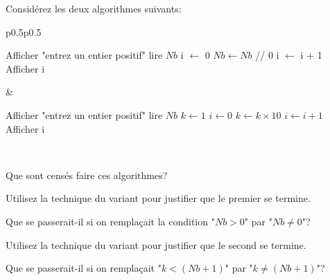 \documentclass[12pt]{article}
\begin{document}
	\begin{MonExo}
		Considérez les deux algorithmes suivants:
		\vspace{\baselineskip}
		
		\begin{tabular}{p{0.5\textwidth}p{0.5\textwidth}}
			\begin{minipage}{\linewidth}
				\begin{algorithmic}[1]
					\State Afficher "entrez un entier positif"
					\State lire $Nb$
					\State i $\leftarrow$ 0
					\State $Nb \leftarrow Nb$ // $0$
					\State i $\leftarrow$ i + 1
					\EndWhile
					\State Afficher i
				\end{algorithmic}
			\end{minipage}
		&
			\begin{minipage}{\linewidth}
				\begin{algorithmic}[1]
					\State Afficher "entrez un entier positif"
			 		\State lire $Nb$
			 		\State $k \leftarrow 1$
			 		\State $i \leftarrow 0$
			 		\State $k \leftarrow k \times 10$
			 		\State $i \leftarrow i + 1$
			 		\EndWhile
			 		\State Afficher i
			 	\end{algorithmic}
			 \end{minipage}
		\\
		\end{tabular}
		\vspace{\baselineskip}
		
		\begin{alphenum}
			\item Que sont censés faire ces algorithmes?
			\item Utilisez la technique du variant pour justifier que le premier se termine.
			\item Que se passerait-il si on remplaçait la condition "$Nb > 0$" par "$Nb \neq 0$"?
			\item Utilisez la technique du variant pour justifier que le second se termine.
			\item Que se passerait-il si on remplaçait "$k < (Nb + 1)$" par "$k \neq (Nb + 1)$"?
		\end{alphenum}
	\end{MonExo}
\end{document}
